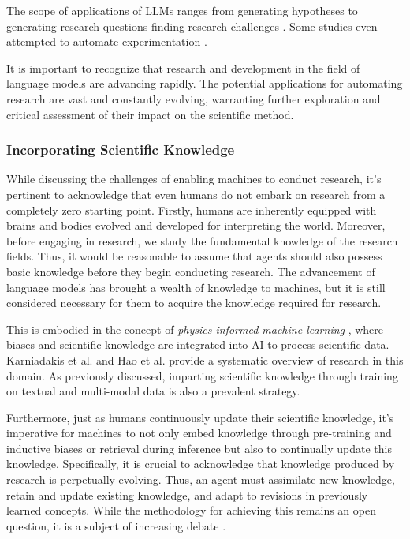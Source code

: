 \documentclass{article}
\begin{document}
The scope of applications of LLMs ranges from generating hypotheses to generating research questions finding research challenges \cite{liu2023creative,oppenlaender2023mapping,lahat2023evaluating}. Some studies even attempted to automate experimentation \cite{boiko2023emergent,qin2023gpt}. 

It is important to recognize that research and development in the field of language models are advancing rapidly. The potential applications for automating research are vast and constantly evolving, warranting further exploration and critical assessment of their impact on the scientific method.

\subsubsection{Incorporating Scientific Knowledge}

While discussing the challenges of enabling machines to conduct research, it's pertinent to acknowledge that even humans do not embark on research from a completely zero starting point. Firstly, humans are inherently equipped with brains and bodies evolved and developed for interpreting the world. Moreover, before engaging in research, we study the fundamental knowledge of the research fields. Thus, it would be reasonable to assume that agents should also possess basic knowledge before they begin conducting research. The advancement of language models has brought a wealth of knowledge to machines, but it is still considered necessary for them to acquire the knowledge required for research.

This is embodied in the concept of \textit{physics-informed machine learning} \cite{karniadakis2021physics}, where biases and scientific knowledge are integrated into AI to process scientific data. Karniadakis et al. \cite{karniadakis2021physics} and Hao et al. \cite{hao2022physics} provide a systematic overview of research in this domain. As previously discussed, imparting scientific knowledge through training on textual and multi-modal data is also a prevalent strategy.

Furthermore, just as humans continuously update their scientific knowledge, it's imperative for machines to not only embed knowledge through pre-training and inductive biases or retrieval during inference but also to continually update this knowledge. Specifically, it is crucial to acknowledge that knowledge produced by research is perpetually evolving. Thus, an agent must assimilate new knowledge, retain and update existing knowledge, and adapt to revisions in previously learned concepts. While the methodology for achieving this remains an open question, it is a subject of increasing debate \cite{kitano2021nobel,zenil2023future}.
\end{document}
